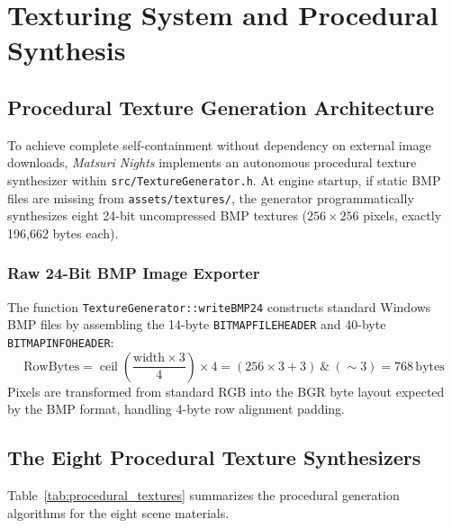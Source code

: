 \chapter{Texturing System and Procedural Synthesis}
\label{chap:texturing}

\section{Procedural Texture Generation Architecture}
To achieve complete self-containment without dependency on external image downloads, \textit{Matsuri Nights} implements an autonomous procedural texture synthesizer within \texttt{src/TextureGenerator.h}. At engine startup, if static BMP files are missing from \texttt{assets/textures/}, the generator programmatically synthesizes eight 24-bit uncompressed BMP textures ($256 \times 256$ pixels, exactly 196,662 bytes each).

\subsection{Raw 24-Bit BMP Image Exporter}
The function \texttt{TextureGenerator::writeBMP24} constructs standard Windows BMP files by assembling the 14-byte \texttt{BITMAPFILEHEADER} and 40-byte \texttt{BITMAPINFOHEADER}:
\begin{equation}
\text{RowBytes} = \operatorname{ceil}\left( \frac{\text{width} \times 3}{4} \right) \times 4 = (256 \times 3 + 3) \ \& \ (\sim 3) = 768\,\text{bytes}
\end{equation}
Pixels are transformed from standard RGB into the BGR byte layout expected by the BMP format, handling 4-byte row alignment padding.

\section{The Eight Procedural Texture Synthesizers}
Table~\ref{tab:procedural_textures} summarizes the procedural generation algorithms for the eight scene materials.

